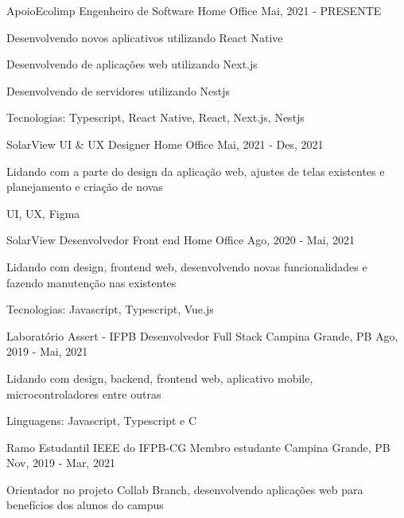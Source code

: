 
\begin{cventries}
  \cventry
  {ApoioEcolimp} %
  {Engenheiro de Software} %
  {Home Office} %
  {Mai, 2021 - PRESENTE} %
  {
    \begin{cvitems} %
      \item {Desenvolvendo novos aplicativos utilizando React Native}
      \item {Desenvolvendo de aplicações web utilizando Next.js}
      \item {Desenvolvendo de servidores utilizando Nestjs}
      \item {Tecnologias: Typescript, React Native, React, Next.js, Nestjs}
    \end{cvitems}
  }

  \cventry
    {SolarView}
    {UI \& UX Designer}
    {Home Office}
    {Mai, 2021 - Des, 2021}
    {
      \begin{cvitems}
        \item {Lidando com a parte do design da aplicação web, ajustes de telas existentes e planejamento e criação de novas}
        \item {UI, UX, Figma}
      \end{cvitems}
    }

  \cventry
    {SolarView}
    {Desenvolvedor Front end}
    {Home Office}
    {Ago, 2020 - Mai, 2021}
    {
      \begin{cvitems}
        \item {Lidando com design, frontend web, desenvolvendo novas funcionalidades e fazendo manutenção nas existentes}
        \item {Tecnologias: Javascript, Typescript, Vue.js}
      \end{cvitems}
    }

  \cventry
    {Laboratório Assert - IFPB}
    {Desenvolvedor Full Stack}
    {Campina Grande, PB}
    {Ago, 2019 - Mai, 2021}
    {
      \begin{cvitems}
        \item {Lidando com design, backend, frontend web, aplicativo mobile, microcontroladores entre outras}
        \item {Linguagens: Javascript, Typescript e C}
      \end{cvitems}
    }

  \cventry
    {Ramo Estudantil IEEE do IFPB-CG}
    {Membro estudante}
    {Campina Grande, PB}
    {Nov, 2019 - Mar, 2021}
    {
      \begin{cvitems}
        \item {Orientador no projeto Collab Branch, desenvolvendo aplicações web para benefícios dos alunos do campus}
      \end{cvitems}
    }
    

\end{cventries}
